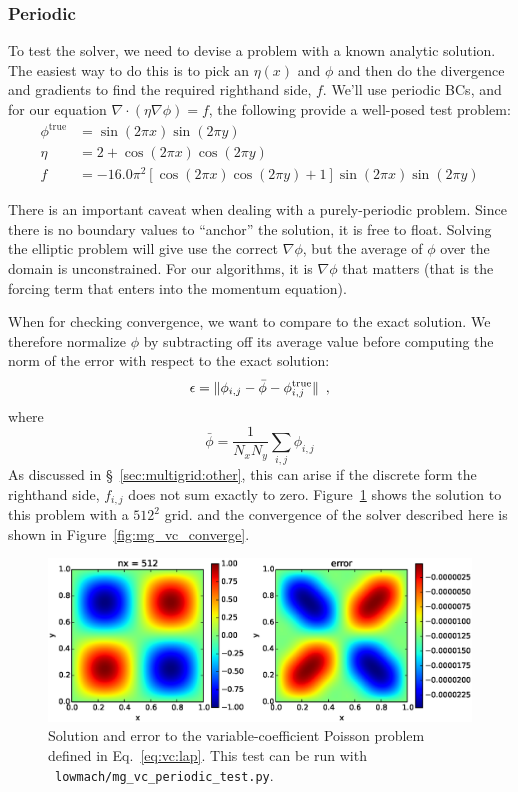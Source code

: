 \subsubsection{Periodic}

To test the solver, we need to devise a problem with a known analytic
solution.  The easiest way to do this is to pick an $\eta(x)$ and
$\phi$ and then do the divergence and gradients to find the required
righthand side, $f$.  We'll use periodic BCs, and for our
equation $\nabla \cdot ( \eta \nabla \phi ) = f$, the following
provide a well-posed test problem:
\begin{align}
\phi^\mathrm{true} &= \sin(2 \pi x) \sin(2\pi y) \nonumber \\
\eta &= 2 + \cos(2\pi x) \cos(2\pi y)  \label{eq:vc:lap}
\\
f &= -16.0 \pi^2 \left [ \cos(2\pi x)\cos(2\pi y) + 1 \right ] \sin(2\pi x)\sin(2 \pi y) \nonumber
\end{align}

There is an important caveat when dealing with a purely-periodic
problem.  Since there is no boundary values to ``anchor'' the solution,
it is free to float.  Solving the elliptic problem will give use the
correct $\nabla \phi$, but the average of $\phi$ over the domain is 
unconstrained.  For our algorithms, it is $\nabla \phi$ that matters
(that is the forcing term that enters into the momentum equation).

When for checking convergence, we want to compare to the exact solution.
We therefore normalize $\phi$ by subtracting off its average value before
computing the norm of the error with respect to the exact solution:
\begin{equation}
\epsilon = \| \phi_{i,j} - \bar{\phi} - \phi^\mathrm{true}_{i,j} \| \enskip ,
\end{equation}
where
\begin{equation}
\bar{\phi} = \frac{1}{N_x N_y} \sum_{i,j} \phi_{i,j}
\end{equation}
As discussed in \S~\ref{sec:multigrid:other}, this can arise if
the discrete form the righthand side, $f_{i,j}$ does not sum exactly
to zero.  Figure~\ref{fig:mg_vc} shows the solution to this problem
with a $512^2$ grid. and the convergence of the solver described
here is shown in Figure~\ref{fig:mg_vc_converge}.

\begin{figure}[t]
\centering
\includegraphics[width=\linewidth]{mg_vc_periodic_test}
\caption{\label{fig:mg_vc} Solution and error to the variable-coefficient 
Poisson problem defined in Eq.~\ref{eq:vc:lap}.  This test can be
run with \pyro\ {\tt lowmach/mg\_vc\_periodic\_test.py}.}
\end{figure}

